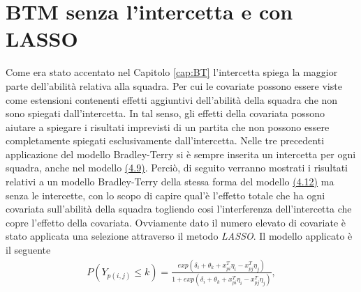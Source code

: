 \section{BTM senza l'intercetta e con LASSO}
Come era stato accentato nel Capitolo \ref{cap:BT} l'intercetta spiega la maggior parte dell'abilità relativa alla squadra. Per cui le covariate possono essere viste come estensioni contenenti effetti aggiuntivi dell'abilità della squadra che non sono spiegati dall'intercetta. In tal senso, gli effetti della covariata possono aiutare a spiegare i risultati imprevisti di un partita che non possono essere completamente spiegati esclusivamente dall'intercetta. Nelle tre precedenti applicazione del modello Bradley-Terry si è sempre inserita un intercetta per ogni squadra, anche nel modello \hyperref[for:3.9]{(4.9)}. Perciò, di seguito verranno mostrati i risultati relativi a un modello Bradley-Terry della stessa forma del modello \hyperref[for:4.9]{(4.12)} ma senza le intercette, con lo scopo di capire qual'è l'effetto totale che ha ogni covariata sull'abilità della squadra togliendo cosi l'interferenza dell'intercetta che copre l'effetto della covariata. Ovviamente dato il numero elevato di covariate è stato applicata una selezione attraverso il metodo \emph{LASSO}. Il modello applicato è il seguente
\begin{align}
	P(Y_{p(i,j)}\leq k) =  \frac{exp(\delta_i + \theta_{k} + x^T_{pi}\eta_i - x^T_{pj}\eta_j)}{1 + exp(\delta_i + \theta_{k} + x^T_{pi}\eta_i - x^T_{pj}\eta_j)},\label{for:5.2}
\end{align}


